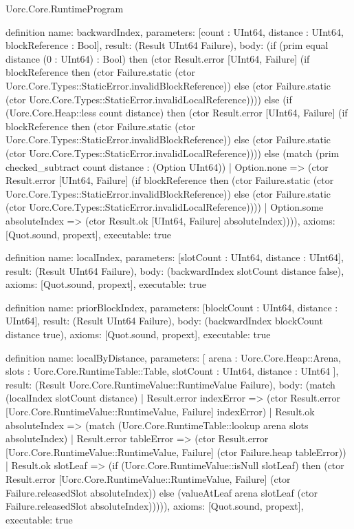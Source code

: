 \begin{lexlean}{Uorc.Core.RuntimeProgram}
\begin{semanticmodule}
definition{
  name: backwardIndex,
  parameters: [count : UInt64, distance : UInt64, blockReference : Bool],
  result: (Result UInt64 Failure),
  body: (if (prim equal distance (0 : UInt64) : Bool) then (ctor Result.error [UInt64, Failure] (if blockReference then (ctor Failure.static (ctor Uorc.Core.Types::StaticError.invalidBlockReference)) else (ctor Failure.static (ctor Uorc.Core.Types::StaticError.invalidLocalReference)))) else (if (Uorc.Core.Heap::less count distance) then (ctor Result.error [UInt64, Failure] (if blockReference then (ctor Failure.static (ctor Uorc.Core.Types::StaticError.invalidBlockReference)) else (ctor Failure.static (ctor Uorc.Core.Types::StaticError.invalidLocalReference)))) else (match (prim checked_subtract count distance : (Option UInt64))
    | Option.none => (ctor Result.error [UInt64, Failure] (if blockReference then (ctor Failure.static (ctor Uorc.Core.Types::StaticError.invalidBlockReference)) else (ctor Failure.static (ctor Uorc.Core.Types::StaticError.invalidLocalReference))))
    | Option.some absoluteIndex => (ctor Result.ok [UInt64, Failure] absoluteIndex)))),
  axioms: [Quot.sound, propext],
  executable: true
}

definition{
  name: localIndex,
  parameters: [slotCount : UInt64, distance : UInt64],
  result: (Result UInt64 Failure),
  body: (backwardIndex slotCount distance false),
  axioms: [Quot.sound, propext],
  executable: true
}

definition{
  name: priorBlockIndex,
  parameters: [blockCount : UInt64, distance : UInt64],
  result: (Result UInt64 Failure),
  body: (backwardIndex blockCount distance true),
  axioms: [Quot.sound, propext],
  executable: true
}

definition{
  name: localByDistance,
  parameters: [
    arena : Uorc.Core.Heap::Arena,
    slots : Uorc.Core.RuntimeTable::Table,
    slotCount : UInt64,
    distance : UInt64
  ],
  result: (Result Uorc.Core.RuntimeValue::RuntimeValue Failure),
  body: (match (localIndex slotCount distance)
    | Result.error indexError => (ctor Result.error [Uorc.Core.RuntimeValue::RuntimeValue, Failure] indexError)
    | Result.ok absoluteIndex => (match (Uorc.Core.RuntimeTable::lookup arena slots absoluteIndex)
      | Result.error tableError => (ctor Result.error [Uorc.Core.RuntimeValue::RuntimeValue, Failure] (ctor Failure.heap tableError))
      | Result.ok slotLeaf => (if (Uorc.Core.RuntimeValue::isNull slotLeaf) then (ctor Result.error [Uorc.Core.RuntimeValue::RuntimeValue, Failure] (ctor Failure.releasedSlot absoluteIndex)) else (valueAtLeaf arena slotLeaf (ctor Failure.releasedSlot absoluteIndex))))),
  axioms: [Quot.sound, propext],
  executable: true
}


\end{semanticmodule}
\end{lexlean}
